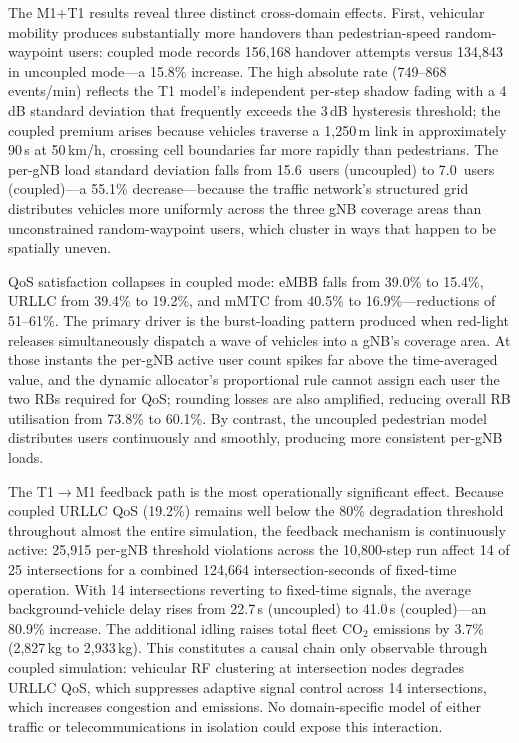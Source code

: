 The M1+T1 results reveal three distinct cross-domain effects. First, vehicular mobility produces substantially more handovers than pedestrian-speed random-waypoint users: coupled mode records 156{,}168 handover attempts versus 134{,}843 in uncoupled mode---a 15.8\% increase. The high absolute rate (749--868 events/min) reflects the T1 model's independent per-step shadow fading with a 4\,dB standard deviation that frequently exceeds the 3\,dB hysteresis threshold; the coupled premium arises because vehicles traverse a 1{,}250\,m link in approximately 90\,s at 50\,km/h, crossing cell boundaries far more rapidly than pedestrians. The per-gNB load standard deviation falls from 15.6~users (uncoupled) to 7.0~users (coupled)---a 55.1\% decrease---because the traffic network's structured grid distributes vehicles more uniformly across the three gNB coverage areas than unconstrained random-waypoint users, which cluster in ways that happen to be spatially uneven.

QoS satisfaction collapses in coupled mode: eMBB falls from 39.0\% to 15.4\%, URLLC from 39.4\% to 19.2\%, and mMTC from 40.5\% to 16.9\%---reductions of 51--61\%. The primary driver is the burst-loading pattern produced when red-light releases simultaneously dispatch a wave of vehicles into a gNB's coverage area. At those instants the per-gNB active user count spikes far above the time-averaged value, and the dynamic allocator's proportional rule cannot assign each user the two RBs required for QoS; rounding losses are also amplified, reducing overall RB utilisation from 73.8\% to 60.1\%. By contrast, the uncoupled pedestrian model distributes users continuously and smoothly, producing more consistent per-gNB loads.

The T1$\rightarrow$M1 feedback path is the most operationally significant effect. Because coupled URLLC QoS (19.2\%) remains well below the 80\% degradation threshold throughout almost the entire simulation, the feedback mechanism is continuously active: 25{,}915 per-gNB threshold violations across the 10{,}800-step run affect 14 of 25 intersections for a combined 124{,}664 intersection-seconds of fixed-time operation. With 14 intersections reverting to fixed-time signals, the average background-vehicle delay rises from 22.7\,s (uncoupled) to 41.0\,s (coupled)---an 80.9\% increase. The additional idling raises total fleet CO$_2$ emissions by 3.7\% (2{,}827\,kg to 2{,}933\,kg). This constitutes a causal chain only observable through coupled simulation: vehicular RF clustering at intersection nodes degrades URLLC QoS, which suppresses adaptive signal control across 14 intersections, which increases congestion and emissions. No domain-specific model of either traffic or telecommunications in isolation could expose this interaction.


